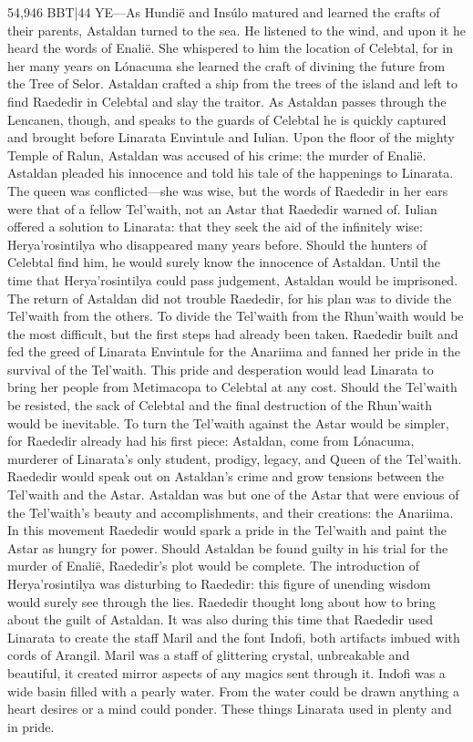 \documentclass[smalldemyvopaper,11pt,twoside,onecolumn,openright,extrafontsizes]{memoir}
\begin{document}
{{54,946 BBT|44 YE—As Hundië and Insúlo matured and learned the crafts of their parents, Astaldan turned to the sea. He listened to the wind, and upon it he heard the words of Enalië. She whispered to him the location of Celebtal, for in her many years on Lónacuma she learned the craft of divining the future from the Tree of Selor. Astaldan crafted a ship from the trees of the island and left to find Raededir in Celebtal and slay the traitor. As Astaldan passes through the Lencanen, though, and speaks to the guards of Celebtal he is quickly captured and brought before Linarata Envintule and Iulian. Upon the floor of the mighty Temple of Ralun, Astaldan was accused of his crime: the murder of Enalië. Astaldan pleaded his innocence and told his tale of the happenings to Linarata. The queen was conflicted—she was wise, but the words of Raededir in her ears were that of a fellow Tel’waith, not an Astar that Raededir warned of. Iulian offered a solution to Linarata: that they seek the aid of the infinitely wise: Herya’rosintilya who disappeared many years before. Should the hunters of Celebtal find him, he would surely know the innocence of Astaldan. Until the time that Herya’rosintilya could pass judgement, Astaldan would be imprisoned.
	The return of Astaldan did not trouble Raededir, for his plan was to divide the Tel’waith from the others. To divide the Tel’waith from the Rhun’waith would be the most difficult, but the first steps had already been taken. Raededir built and fed the greed of Linarata Envintule for the Anariima and fanned her pride in the survival of the Tel’waith. This pride and desperation would lead Linarata to bring her people from Metimacopa to Celebtal at any cost. Should the Tel’waith be resisted, the sack of Celebtal and the final destruction of the Rhun’waith would be inevitable. To turn the Tel’waith against the Astar would be simpler, for Raededir already had his first piece: Astaldan, come from Lónacuma, murderer of Linarata’s only student, prodigy, legacy, and Queen of the Tel’waith. Raededir would speak out on Astaldan’s crime and grow tensions between the Tel’waith and the Astar. Astaldan was but one of the Astar that were envious of the Tel’waith’s beauty and accomplishments, and their creations: the Anariima. In this movement Raededir would spark a pride in the Tel’waith and paint the Astar as hungry for power. Should Astaldan be found guilty in his trial for the murder of Enalië, Raededir’s plot would be complete. The introduction of Herya’rosintilya was disturbing to Raededir: this figure of unending wisdom would surely see through the lies. Raededir thought long about how to bring about the guilt of Astaldan.
	It was also during this time that Raededir used Linarata to create the staff Maril and the font Indofi, both artifacts imbued with cords of Arangil. Maril was a staff of glittering crystal, unbreakable and beautiful, it created mirror aspects of any magics sent through it. Indofi was a wide basin filled with a pearly water. From the water could be drawn anything a heart desires or a mind could ponder. These things Linarata used in plenty and in pride.

}}
\end{document}
